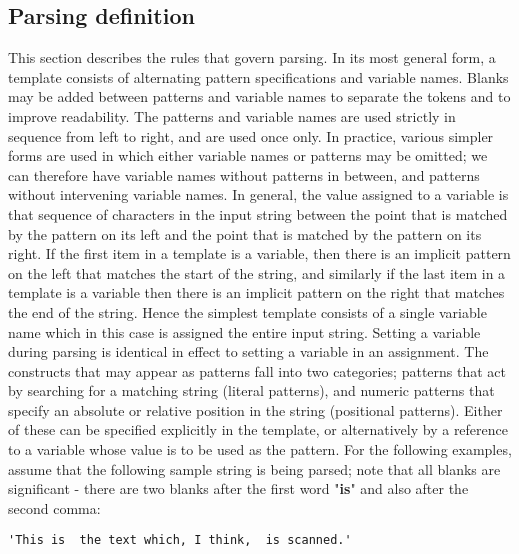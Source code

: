 \subsection{Parsing definition}\label{}
 This section describes the rules that govern parsing.
 In its most general form, a template consists of alternating pattern
specifications and variable names.  Blanks may be added between
patterns and variable names to separate the tokens and to improve
readability.  The patterns and variable names are used strictly in
sequence from left to right, and are used once only.  In practice,
various simpler forms are used in which either variable names or
patterns may be omitted; we can therefore have variable names without
patterns in between, and patterns without intervening variable names.
 In general, the value assigned to a variable is that sequence of
characters in the input string between the point that is matched by the
pattern on its left and the point that is matched by the pattern on its
right.
 If the first item in a template is a variable, then there is an
implicit pattern on the left that matches the start of the string, and
similarly if the last item in a template is a variable then there is an
implicit pattern on the right that matches the end of the string.
Hence the simplest template consists of a single variable name which in
this case is assigned the entire input string.
 Setting a variable during parsing is identical in effect to setting a
variable in an assignment.
 The constructs that may appear as patterns fall into two categories;
patterns that act by searching for a matching string (literal
patterns), and numeric patterns that specify an absolute or relative
position in the string (positional patterns).
Either of these can be specified explicitly in the template, or
alternatively by a reference to a variable whose value is to be used
as the pattern.
 For the following examples, assume that the following sample string
is being parsed; note that all blanks are significant - there are
two blanks after the first word "\textbf{is}" and also after the
second comma:
\begin{lstlisting}
'This is  the text which, I think,  is scanned.'
\end{lstlisting}
